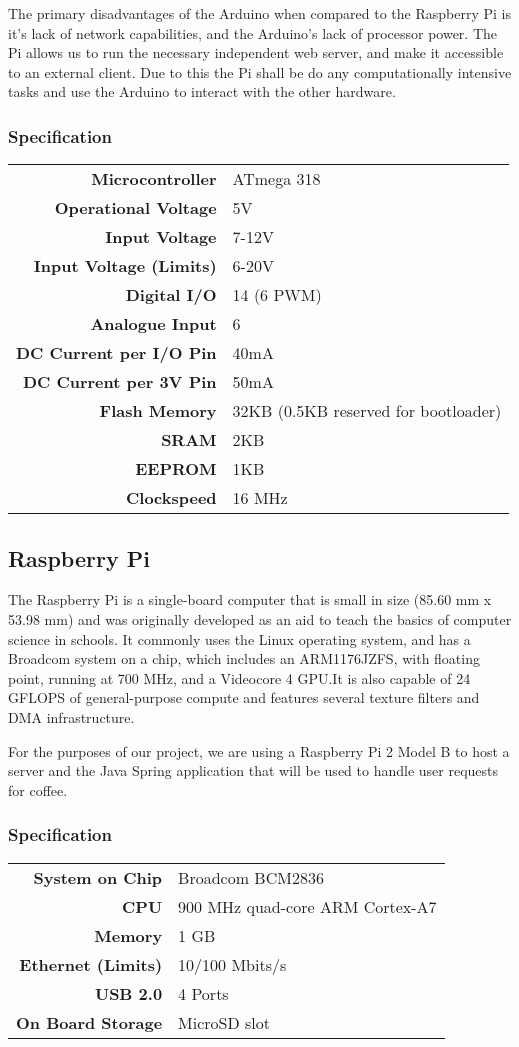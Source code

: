 \documentclass[12pt, a4paper]{article}
\begin{document}
The primary disadvantages of the Arduino when compared to the Raspberry Pi is
it's lack of network capabilities, and the Arduino's lack of processor power.
The Pi allows us to run the necessary independent web server, and make it
accessible to an external client. Due to this the Pi shall be do any
computationally intensive tasks and use the Arduino to interact with the other
hardware.

\subsubsection{Specification}
\begin{tabular}{>{\bfseries}r l}
	Microcontroller & ATmega 318 \\
	Operational Voltage & 5V \\
	Input Voltage & 7-12V \\
	Input Voltage (Limits) & 6-20V \\
	Digital I/O & 14 (6 PWM) \\
	Analogue Input & 6 \\
	DC Current per I/O Pin & 40mA \\
	DC Current per 3V Pin & 50mA \\
	Flash Memory & 32KB (0.5KB reserved for bootloader) \\
	SRAM & 2KB \\
	EEPROM & 1KB \\
	Clockspeed & 16 MHz \\
\end{tabular}

\subsection{Raspberry Pi}
The Raspberry Pi is a single-board computer that is small in size (85.60 mm x
53.98 mm) and was originally developed as an aid to teach the basics of computer
science in schools. It commonly uses the Linux operating system, and has a
Broadcom system on a chip, which includes an ARM1176JZFS, with floating point,
running at 700 MHz, and a Videocore 4 GPU.It is also capable of 24 GFLOPS of
general-purpose compute and features several texture filters and DMA
infrastructure.

For the purposes of our project, we are using a Raspberry Pi 2 Model B to host a
server and the Java Spring application that will be used to handle user requests
for coffee.

\subsubsection{Specification}
\begin{tabular}{>{\bfseries}r l}
	System on Chip & Broadcom BCM2836 \\
	CPU & 900 MHz quad-core ARM Cortex-A7 \\
	Memory & 1 GB \\
	Ethernet (Limits) & 10/100 Mbits/s \\
	USB 2.0 & 4 Ports \\
	On Board Storage & MicroSD slot \\
\end{tabular}
\end{document}
